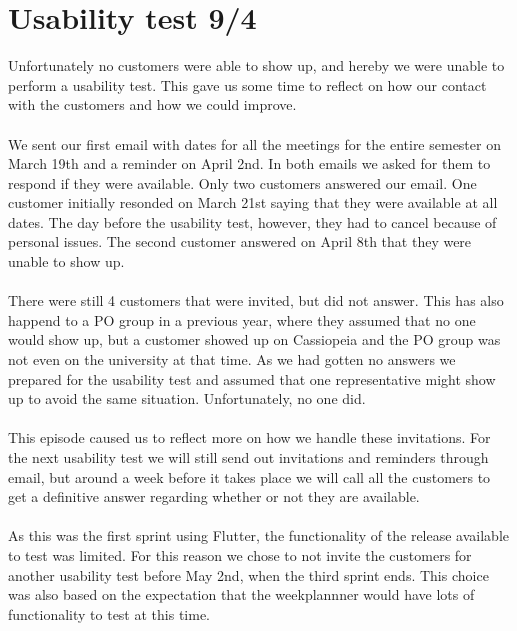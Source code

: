 \section{Usability test 9/4}
Unfortunately no customers were able to show up, and hereby we were unable to perform a usability test.
This gave us some time to reflect on how our contact with the customers and how we could improve.
\\\\
We sent our first email with dates for all the meetings for the entire semester on March 19th and a reminder on April 2nd.
In both emails we asked for them to respond if they were available. 
Only two customers answered our email. 
One customer initially resonded on March 21st saying that they were available at all dates. 
The day before the usability test, however, they had to cancel because of personal issues.
The second customer answered on April 8th that they were unable to show up.
\\\\
There were still 4 customers that were invited, but did not answer.
This has also happend to a PO group in a previous year, where they assumed that no one would show up, but a customer showed up on Cassiopeia and the PO group was not even on the university at that time. 
As we had gotten no answers we prepared for the usability test and assumed that one representative might show up to avoid the same situation.
Unfortunately, no one did.
\\\\
This episode caused us to reflect more on how we handle these invitations.
For the next usability test we will still send out invitations and reminders through email, but around a week before it takes place we will call all the customers to get a definitive answer regarding whether or not they are available. 
\\\\
As this was the first sprint using Flutter, the functionality of the release available to test was limited. 
For this reason we chose to not invite the customers for another usability test before May 2nd, when the third sprint ends.
This choice was also based on the expectation that the weekplannner would have lots of functionality to test at this time.
